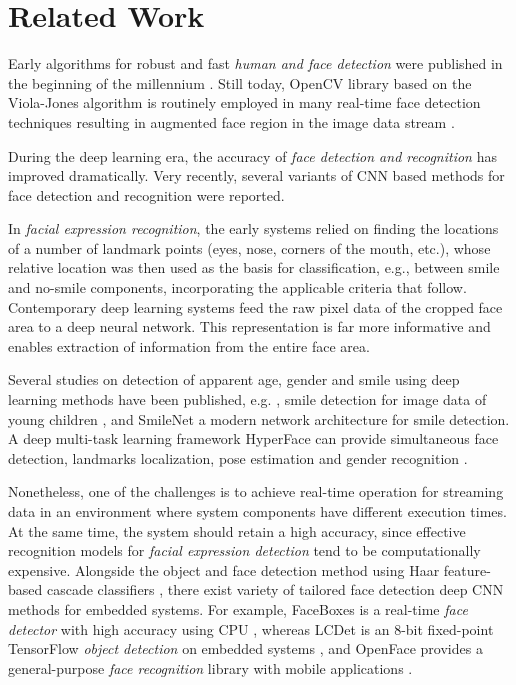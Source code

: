 \documentclass[conference]{IEEEtran}
\begin{document}
\section{Related Work}
\label{sec:related}

Early algorithms for robust and fast \textit{human and face detection} were published in the beginning of the millennium \cite{dalal2005, viola}. Still today, OpenCV library based on the Viola-Jones algorithm \cite{viola} is routinely employed in many real-time face detection techniques resulting in augmented face region in the image data stream \cite{Cha2014, tsai2015, kazanskiy2017, elrefe2017}.


During the deep learning era, the accuracy of \textit{face detection and recognition} has improved dramatically. Very recently, several variants of CNN based methods for face detection \cite{jiang2017, YangLLT17, Mamalet, Farrugia, Garcia} and recognition \cite{hu2015face, byeon2016, arse2017, ChiZC17} were reported. 

In \textit{facial expression recognition}, the early systems relied on finding the locations of a number of landmark points (eyes, nose, corners of the mouth, etc.), whose relative location was then used as the basis for classification, e.g., between smile and no-smile components, incorporating the applicable criteria that follow. Contemporary deep learning systems feed the raw pixel data of the cropped face area to a deep neural network. This representation is far more informative and enables extraction of information from the entire face area. 

Several studies on detection of apparent age, gender and smile using deep learning methods have been published, e.g. \cite{uri2106}, smile detection for image data of young children \cite{xia2017}, and SmileNet \cite{smilenet} a modern network architecture  for smile detection. A deep multi-task learning framework HyperFace can provide simultaneous face detection, landmarks localization, pose estimation and gender recognition \cite{ranjan2017}.

Nonetheless, one of the challenges is to achieve real-time operation for streaming data in an environment where  system components have different execution times. At the same time, the system should retain a high accuracy, since effective recognition models for \textit{facial expression detection} tend to be computationally expensive. Alongside the object and face detection method using Haar feature-based cascade classifiers \cite{viola}, there exist variety of tailored face detection deep CNN methods for embedded systems. For example, FaceBoxes is a real-time \textit{face detector} with high accuracy using CPU \cite{zhang2017}, whereas LCDet is an 8-bit fixed-point TensorFlow \textit{object detection} on embedded systems \cite{tripathi2017}, and OpenFace provides a general-purpose \textit{face recognition} library with mobile applications \cite{amos2016openface}.
\end{document}
